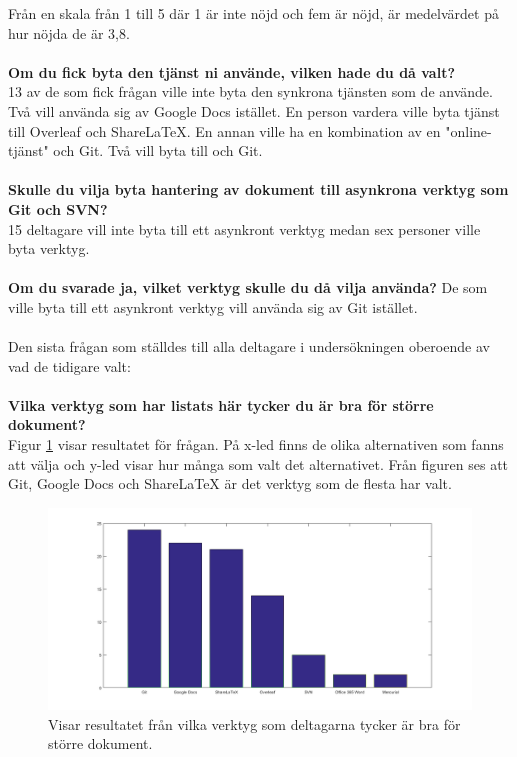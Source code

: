 Från en skala från 1 till 5 där 1 är inte nöjd och fem är nöjd, är medelvärdet på hur nöjda de är 3,8.\\\\
\textbf{Om du fick byta den tjänst ni använde, vilken hade du då valt?}\\ 
13 av de som fick frågan ville inte byta den synkrona tjänsten som de använde. Två vill använda sig av Google Docs istället. En person vardera ville byta tjänst till Overleaf och ShareLaTeX. En annan ville ha en kombination av en "online-tjänst" och Git. Två vill byta till \latex och Git.\\\\
\textbf{Skulle du vilja byta hantering av dokument till asynkrona verktyg som Git och SVN?}\\
15 deltagare vill inte byta till ett asynkront verktyg medan sex personer ville byta verktyg.\\\\
\textbf{Om du svarade ja, vilket verktyg skulle du då vilja använda?}
De som ville byta till ett asynkront verktyg vill använda sig av Git istället.\\\\
Den sista frågan som ställdes till alla deltagare i undersökningen oberoende av vad de tidigare valt:\\\\
\textbf{Vilka verktyg som har listats här tycker du är bra för större dokument?}\\
Figur \ref{fig:best_document_tool} visar resultatet för frågan. På x-led finns de olika alternativen som fanns att välja och y-led visar hur många som valt det alternativet. Från figuren ses att Git, Google Docs och ShareLaTeX är det verktyg som de flesta har valt.

\begin{figure}[H]	
	\includegraphics[scale=0.4]{figures/best_document_tool.png}
	\centering
	\caption{Visar resultatet från vilka verktyg som deltagarna tycker är bra för större dokument.}
	\label{fig:best_document_tool}
\end{figure}

